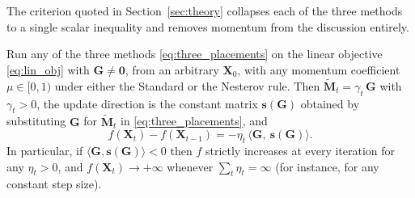 \paragraph{} 

\section{}\label{app:divergence}
\subsection{}\label{app:proof_reduction}

The criterion quoted in Section~\ref{sec:theory} collapses each of the three methods to a single scalar inequality and removes momentum from the discussion entirely.

\begin{proposition}\label{prop:reduction}
Run any of the three methods \eqref{eq:three_placements} on the linear objective \eqref{eq:lin_obj} with $\mathbf{G}\neq\mathbf{0}$, from an arbitrary $\mathbf{X}_0$, with any momentum coefficient $\mu\in[0,1)$ under either the Standard or the Nesterov rule.  Then $\tilde{\mathbf{M}}_t=\gamma_t\,\mathbf{G}$ with $\gamma_t>0$, the update direction is the constant matrix $\mathbf{s}(\mathbf{G})$ obtained by substituting $\mathbf{G}$ for $\tilde{\mathbf{M}}_t$ in \eqref{eq:three_placements}, and
\begin{equation*}
f(\mathbf{X}_{t})-f(\mathbf{X}_{t-1})=-\eta_t\,\bigl\langle \mathbf{G},\ \mathbf{s}(\mathbf{G})\bigr\rangle .
\end{equation*}
In particular, if $\langle \mathbf{G},\mathbf{s}(\mathbf{G})\rangle<0$ then $f$ strictly increases at every iteration for any $\eta_t>0$, and $f(\mathbf{X}_t)\to+\infty$ whenever $\sum_t\eta_t=\infty$ (for instance, for any constant step size).
\end{proposition}

